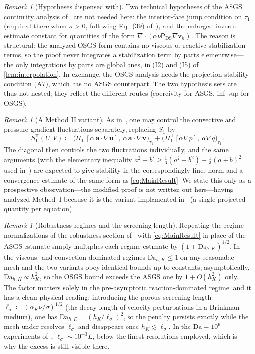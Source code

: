 \documentclass[11pt]{article}
\theoremstyle{remark}
\newtheorem{remark}[theorem]{Remark}
\newcommand{\bu}{\boldsymbol{u}}
\newcommand{\bv}{\boldsymbol{v}}
\newcommand{\ba}{\boldsymbol{a}}
\newcommand{\ViscProj}{\mathsf{P}_{\mathrm{DS}}}
\newcommand{\Dah}{\mathrm{Da}_{h,K}}
\newcommand{\Poneo}{\Pi_{1}^{\perp}}
\begin{document}
\begin{remark}[Hypotheses dispensed with]
\label{rem:dispensed}
Two technical hypotheses of the ASGS continuity analysis of~\cite{companion} are not
needed here: the interior-face jump condition on $\tau_1$ (required there when
$\sigma > 0$, following Eq.~(39) of~\cite{Codina2001}), and the enlarged
inverse-estimate constant for quantities of the form
$\nabla\cdot(\alpha\nu\ViscProj\nabla\bv_h)$. The reason is structural: the analyzed
OSGS form contains no viscous or reactive stabilization terms, so the proof never
integrates a stabilization term by parts elementwise---the only integrations by parts
are global ones, in (I2) and (I5) of \cref{lem:interpolation}. In exchange, the OSGS
analysis needs the projection stability condition \textup{(A7)}, which has no ASGS
counterpart. The two hypothesis sets are thus not nested; they reflect the different
routes (coercivity for ASGS, inf--sup for OSGS).
\end{remark}

\begin{remark}[A Method II variant]
\label{rem:methodII}
As in~\cite[\S 2.2]{Codina2008}, one may control the convective and pressure-gradient
fluctuations separately, replacing $S_1$ by
\[
  S_1^{\mathrm{II}}(U,V) \coloneqq
  \bigl( \Poneo[\alpha\,\ba\cdot\nabla\bu],\ \alpha\,\ba\cdot\nabla\bv \bigr)_{\tau_1}
  + \bigl( \Poneo[\alpha\nabla p],\ \alpha\nabla q \bigr)_{\tau_1}.
\]
The diagonal then controls the two fluctuations individually, and the same arguments
(with the elementary inequality $a^2 + b^2 \ge \tfrac13(a^2+b^2) + \tfrac13(a+b)^2$
used in~\cite[Theorem~3]{Codina2008}) are expected to give stability in the correspondingly
finer norm and a convergence estimate of the same form as \cref{eq:MainResult}. We state
this only as a prospective observation---the modified proof is not written out here---having
analyzed Method~I because it is the variant implemented in~\cite{companion} (a single
projected quantity per equation).
\end{remark}

\begin{remark}[Robustness regimes and the screening length]
\label{rem:robustness}
Repeating the regime normalizations of the robustness section of~\cite{companion}
with \cref{eq:MainResult} in place of the ASGS estimate simply multiplies each regime
estimate by $(1+\Dah)^{1/2}$. In the viscous- and convection-dominated regimes
$\Dah \le 1$ on any reasonable mesh and the two variants obey identical bounds up to
constants; asymptotically, $\Dah \propto h_K^2$, so the OSGS bound exceeds the ASGS
one by $1 + O(h_K^2)$ only. The factor matters solely in the pre-asymptotic
reaction-dominated regime, and it has a clean physical reading: introducing the
porous screening length $\ell_\sigma \coloneqq (\alpha_K\nu/\sigma)^{1/2}$ (the decay
length of velocity perturbations in a Brinkman medium), one has
$\Dah = (h_K/\ell_\sigma)^2$, so the penalty persists exactly while the mesh
under-resolves $\ell_\sigma$ and disappears once $h_K \lesssim \ell_\sigma$. In the
$\mathrm{Da} = 10^6$ experiments of~\cite{companion}, $\ell_\sigma \sim 10^{-3}L$,
below the finest resolutions employed, which is why the excess is still visible there.
\end{remark}
\end{document}
